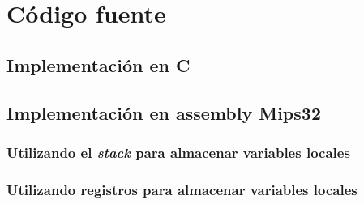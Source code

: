 \documentclass[a4paper]{article}
\begin{document}
\pagebreak

\appendix
\section{Código fuente}
\subsection{Implementación en C}
\label{sec:cod_c}


\pagebreak
\subsection{Implementación en assembly Mips32}
\subsubsection{Utilizando el \textit{stack} para almacenar variables locales}
\label{sec:cod_asm}


\pagebreak
\subsubsection{Utilizando registros para almacenar variables locales}
\label{sec:cod_asm_r}

\end{document}
